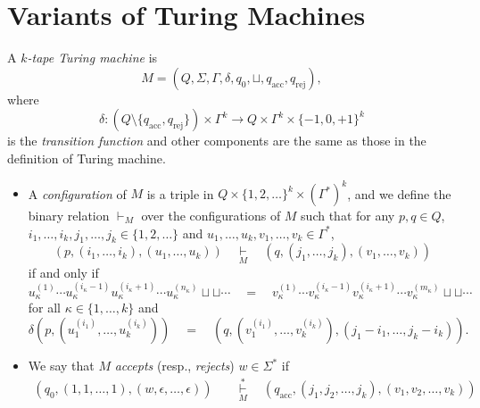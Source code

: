 \section{Variants of Turing Machines}
\begin{definition}
  A \emph{$k$-tape Turing machine} is
  \begin{equation*}
    M = (Q, \Sigma, \Gamma, \delta, q_0, \sqcup, q_\text{acc}, q_\text{rej}),
  \end{equation*}
  where
  \begin{equation*}
    \delta: (Q \setminus \{q_\text{acc}, q_\text{rej}\}) \times \Gamma^k
    \to Q \times \Gamma^k \times \{-1, 0, +1\}^k
  \end{equation*}
  is the \emph{transition function} and other components are the same as those
  in the definition of Turing machine.
  \begin{itemize}
    \item A \emph{configuration} of $M$ is a triple in
    $Q \times \{1, 2, \dots\}^k \times (\Gamma^*)^k$, and we define the binary
    relation $\vdash_M$ over the configurations of $M$ such that for any
    $p, q \in Q$, $i_1, \dots, i_k, j_1, \dots, j_k \in \{1, 2, \dots\}$ and
    $u_1, \dots, u_k, v_1, \dots, v_k \in \Gamma^*$,
    \begin{equation*}
      (p, (i_1, \dots, i_k), (u_1, \dots, u_k))
      \quad \mathop\vdash\limits_{M} \quad
      (q, (j_1, \dots, j_k), (v_1, \dots, v_k))
    \end{equation*}
    if and only if
    \begin{equation*}
      u_\kappa^{(1)} \cdots u_\kappa^{(i_\kappa-1)}
      u_\kappa^{(i_\kappa+1)} \cdots u_\kappa^{(n_\kappa)} \sqcup \sqcup \cdots
      \quad = \quad
      v_\kappa^{(1)} \cdots v_\kappa^{(i_\kappa-1)}
      v_\kappa^{(i_\kappa+1)} \cdots v_\kappa^{(m_\kappa)} \sqcup \sqcup \cdots
    \end{equation*}
    for all $\kappa \in \{1, \dots, k\}$ and
    \begin{equation*}
      \delta(p, (u_1^{(i_1)}, \dots, u_k^{(i_k)}))
      \quad = \quad
      (q, (v_1^{(i_1)}, \dots, v_k^{(i_k)}), (j_1 - i_1, \dots, j_k - i_k)).
    \end{equation*}
    \item We say that $M$ \emph{accepts} (resp., \emph{rejects})
    $w \in \Sigma^*$ if
    \begin{align*}
      (q_0, (1, 1, \dots, 1), (w, \epsilon, \dots, \epsilon))
      \quad &\mathop\vdash\limits_{M}^* \quad
      (q_\text{acc}, (j_1, j_2, \dots, j_k), (v_1, v_2, \dots, v_k)) \\

\end{align*}
\end{itemize}
\end{definition}
